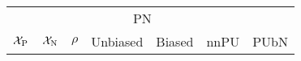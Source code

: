 \begin{table}[t]
  \centering
  \caption{}\label{tab:ExperimentalResults:Full}
  \begin{tabular}{@{}lllllll@{}}
    \toprule
              &           &          & \multicolumn{2}{c}{PN} &       &      \\\cmidrule{4-5}
    $\mathcal{X}_{\textnormal{P}}$ & $\mathcal{X}_{\textnormal{N}}$ & $\rho$   & Unbiased  & Biased      & nnPU  & PUbN \\\midrule
    \bottomrule
  \end{tabular}
\end{table}
